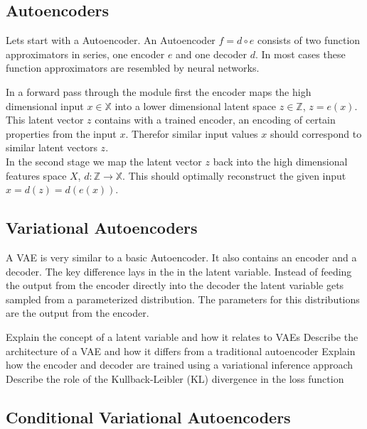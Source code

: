 \subsection{Autoencoders}


Lets start with a Autoencoder. An Autoencoder $f = d \circ e$ consists of two function approximators in series, one encoder $e$ and one decoder $d$. In most cases these function approximators are resembled by neural networks.

In a forward pass through the module first the encoder maps the high dimensional input $x \in \mathbb{X}$ into a lower dimensional latent space $z \in \mathbb{Z}$, $z = e(x)$. This latent vector $z$ contains with a trained encoder, an encoding of certain properties from the input $x$. Therefor similar input values $x$ should correspond to similar latent vectors $z$. \\
In the second stage we map the latent vector $z$ back into the high dimensional features space $X$, $d: \mathbb{Z} \to \mathbb{X}$. This should optimally reconstruct the given input $\hat{x} = d(z) = d(e(x))$. \\



\subsection{Variational Autoencoders}

A VAE is very similar to a basic Autoencoder. It also contains an encoder and a decoder. The key difference lays in the in the latent variable. Instead of feeding the output from the encoder directly into the decoder the latent variable gets sampled from a parameterized distribution. The parameters for this distributions are the output from the encoder.

Explain the concept of a latent variable and how it relates to VAEs
Describe the architecture of a VAE and how it differs from a traditional autoencoder
Explain how the encoder and decoder are trained using a variational inference approach
Describe the role of the Kullback-Leibler (KL) divergence in the loss function

\subsection{Conditional Variational Autoencoders}

